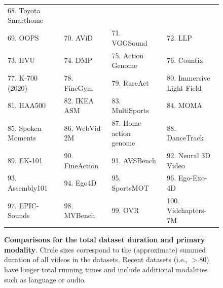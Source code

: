 \begin{figure}[t]
{\begin{tabular}{llll}
      68. Toyota Smarthome~\citep{dai2022toyota} \\
      69. OOPS~\citep{epstein2020oops} &
      70. AViD~\citep{piergiovanni2020avid} &
      71. VGGSound~\citep{chen2020vggsound} &
      72. LLP~\citep{tian2020unified} \\
      73. HVU~\citep{diba2020large} &
      74. DMP~\citet{ortega2020dmd} &
      75. Action Genome~\citep{ji2020action} &
      76. Countix~\citep{dwibedi2020counting} \\
      77. K-700 (2020)~\citep{smaira2020short} &
      78. FineGym~\citep{shao2020finegym} & 
      79. RareAct~\citep{miech2020rareact} &
      80. Immersive Light Field~\citet{broxton2020immersive} \\
      81. HAA500 \citep{chung2021haa500} &
      82. IKEA ASM~\citep{ben2021ikea} &
      83. MultiSports~\citep{li2021multisports} &
      84. MOMA~\citep{luo2021moma} \\
      85. Spoken Moments~\citep{monfort2021spoken} &
      86. WebVid-2M~\citep{bain2021frozen} &
      87. Home action genome~\citep{rai2021home} & 
      88. DanceTrack~\citep{sun2022dancetrack} \\
      89. EK-101~\citep{damen2022rescaling} &
      90. FineAction~\citep{liu2022fineaction} &
      91. AVSBench~\citep{zhou2022audio} &
      92. Neural 3D Video~\citet{li2022neural} \\
      93. Assembly101~\citep{sener2022assembly101} &
      94. Ego4D \citep{grauman2022ego4d} &
      95. SportsMOT~\citep{cui2023sportsmot} &
      96. Ego-Exo-4D \citep{grauman2024ego} \\ 
      97. EPIC-Sounds \citep{huh2023epic} &
      98. MVBench \citep{li2024mvbench} &
      99. OVR \citep{dwibedi2024ovr} &
      100. Vidchapters-7M \citep{yang2024vidchapters}
    \end{tabular}
    }
    \caption{\textbf{Comparisons for the total dataset duration and primary modality}. Circle sizes correspond to the (approximate) summed duration of all videos in the datasets. Recent datasets (i.e., $>80$) have longer total running times and include additional modalities such as language or audio.}
    \label{fig:dataset_blobs}
\end{figure}


